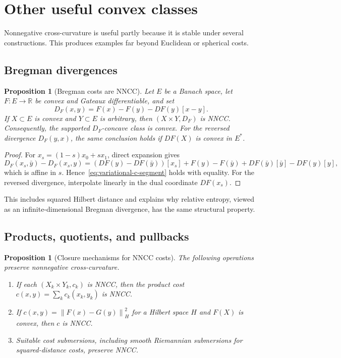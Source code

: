 \documentclass[11pt,a4paper]{article}
\newtheorem{proposition}[theorem]{Proposition}
\theoremstyle{definition}
\theoremstyle{remark}
\newcommand{\R}{\mathbb R}
\newcommand{\norm}[1]{\left\lVert #1\right\rVert}
\begin{document}
\section{Other useful convex classes}

Nonnegative cross-curvature is useful partly because it is stable under several
constructions. This produces examples far beyond Euclidean or spherical costs.

\subsection{Bregman divergences}

\begin{proposition}[Bregman costs are NNCC]\label{prop:bregman}
Let $E$ be a Banach space, let $F:E\to\R$ be convex and Gateaux differentiable,
and set
\[
  D_F(x,y)=F(x)-F(y)-DF(y)[x-y].
\]
If $X\subset E$ is convex and $Y\subset E$ is arbitrary, then
$(X\times Y,D_F)$ is NNCC. Consequently, the supported $D_F$-concave class is
convex. For the reversed divergence $D_F(y,x)$, the same conclusion holds if
$DF(X)$ is convex in $E^*$.
\end{proposition}

\begin{proof}
For $x_s=(1-s)x_0+sx_1$, direct expansion gives
\[
  D_F(x_s,\bar y)-D_F(x_s,y)
  =(DF(y)-DF(\bar y))[x_s]+
    F(y)-F(\bar y)+DF(\bar y)[\bar y]-DF(y)[y],
\]
which is affine in $s$. Hence~\eqref{eq:variational-c-segment} holds with
equality. For the reversed divergence, interpolate linearly in the dual
coordinate $DF(x_s)$.
\end{proof}

This includes squared Hilbert distance and explains why relative entropy,
viewed as an infinite-dimensional Bregman divergence, has the same structural
property.

\subsection{Products, quotients, and pullbacks}

\begin{proposition}[Closure mechanisms for NNCC costs]\label{prop:closures}
The following operations preserve nonnegative cross-curvature.
\begin{enumerate}[label=(\roman*)]
  \item If each $(X_k\times Y_k,c_k)$ is NNCC, then the product cost
  $c(x,y)=\sum_k c_k(x_k,y_k)$ is NNCC.
  \item If $c(x,y)=\norm{F(x)-G(y)}_H^2$ for a Hilbert space $H$ and
  $F(X)$ is convex, then $c$ is NNCC.
  \item Suitable cost submersions, including smooth Riemannian submersions for
  squared-distance costs, preserve NNCC.
\end{enumerate}
\end{proposition}
\end{document}

